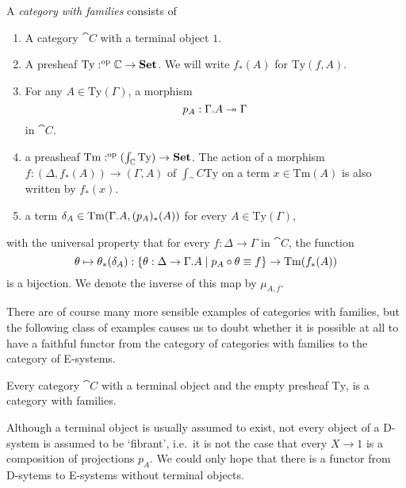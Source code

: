 \begin{defn}
A \emph{category with families} consists of
\begin{enumerate}
\item A category $\cat{C}$ with a terminal object $1$.
\item A presheaf $\mathrm{Ty}:^{\mathrm{op}}{\mathbb{C}}\to\mathbf{Set}$. We will write
$f_\ast(A)$ for $\mathrm{Ty}(f,A)$.
\item For any $A\in\mathrm{Ty}(\Gamma)$, a morphism
\begin{equation*}
p_A : \ctxext{\Gamma}{A}\twoheadrightarrow \Gamma
\end{equation*}
in $\cat{C}$.
\item a preasheaf $\mathrm{Tm}:^{\mathrm{op}}{(\int_\mathbb{C}\mathrm{Ty})}\to\mathbf{Set}$.
The action of a morphism $f:(\Delta,f_\ast(A))\to(\Gamma,A)$ of $\int_\cat{C}\mathrm{Ty}$
on a term $x\in \mathrm{Tm}(A)$ is also written by $f_\ast(x)$.
\item a term $\delta_A\in\mathrm{Tm}(\ctxext{\Gamma}{A},(p_A)_\ast(A))$ for every
$A\in\mathrm{Ty}(\Gamma)$, 
\end{enumerate}
with the universal property that for every $f:\Delta\to\Gamma$ in $\cat{C}$, 
the function
\begin{equation*}
\theta\mapsto\theta_\ast(\delta_A)
  : \{\theta:\Delta\to\ctxext{\Gamma}{A}\mid p_A\circ\theta\jdeq f\}\to
    \mathrm{Tm}(f_\ast(A))
\end{equation*}
is a bijection. We denote the inverse of this map by $\mu_{A,f}$. 
\end{defn}

There are of course many more sensible examples of categories with families,
but the following class of examples causes us to doubt whether it is possible
at all to have a faithful functor from the category of categories
with families to the category of E-systems. 

\begin{eg}
Every category $\cat{C}$ with a terminal object and the empty presheaf 
$\mathrm{Ty}$, is a category with families.
\end{eg}

\begin{rmk}
Although a terminal object is usually assumed to exist, not every object 
of a D-system is assumed to be `fibrant', i.e.~it is
not the case that every $X\to 1$ is a composition of projections $p_A$.
We could only hope that there is a functor from D-sytems to E-systems without
terminal objects.
\end{rmk}

